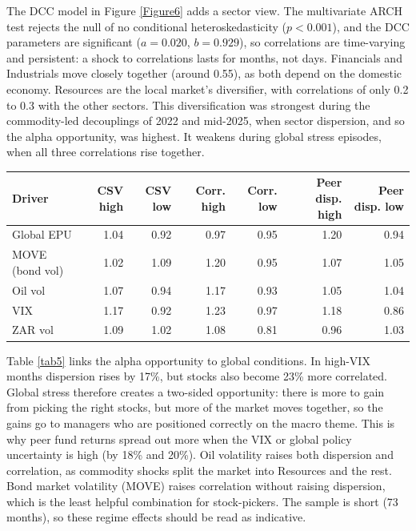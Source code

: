 \documentclass[11pt,preprint]{elsarticle}
\let\origtable\table
\let\endorigtable\endtable
\renewenvironment{table}[1][2] {
    \expandafter\origtable\expandafter[H]
} {
    \endorigtable
}
\numberwithin{equation}{section}
\numberwithin{figure}{section}
\numberwithin{table}{section}
\begin{document}
The DCC model in Figure \ref{Figure6} adds a sector view. The
multivariate ARCH test rejects the null of no conditional
heteroskedasticity (\(p < 0.001\)), and the DCC parameters are
significant (\(a = 0.020\), \(b = 0.929\)), so correlations are
time-varying and persistent: a shock to correlations lasts for months,
not days. Financials and Industrials move closely together (around
0.55), as both depend on the domestic economy. Resources are the local
market's diversifier, with correlations of only 0.2 to 0.3 with the
other sectors. This diversification was strongest during the
commodity-led decouplings of 2022 and mid-2025, when sector dispersion,
and so the alpha opportunity, was highest. It weakens during global
stress episodes, when all three correlations rise together.

\begin{table}[H]
\centering
\caption{Alpha-opportunity measures in high and low macro regimes, relative to their average \label{tab5}} 
\begingroup\footnotesize
\begin{tabular}{lrrrrrr}
  \hline
Driver & CSV high & CSV low & Corr. high & Corr. low & Peer disp. high & Peer disp. low \\ 
  \hline
Global EPU & 1.04 & 0.92 & 0.97 & 0.95 & 1.20 & 0.94 \\ 
  MOVE (bond vol) & 1.02 & 1.09 & 1.20 & 0.95 & 1.07 & 1.05 \\ 
  Oil vol & 1.07 & 0.94 & 1.17 & 0.93 & 1.05 & 1.04 \\ 
  VIX & 1.17 & 0.92 & 1.23 & 0.97 & 1.18 & 0.86 \\ 
  ZAR vol & 1.09 & 1.02 & 1.08 & 0.81 & 0.96 & 1.03 \\ 
   \hline
\end{tabular}
\endgroup
\end{table}

Table \ref{tab5} links the alpha opportunity to global conditions. In
high-VIX months dispersion rises by 17\%, but stocks also become 23\%
more correlated. Global stress therefore creates a two-sided
opportunity: there is more to gain from picking the right stocks, but
more of the market moves together, so the gains go to managers who are
positioned correctly on the macro theme. This is why peer fund returns
spread out more when the VIX or global policy uncertainty is high (by
18\% and 20\%). Oil volatility raises both dispersion and correlation,
as commodity shocks split the market into Resources and the rest. Bond
market volatility (MOVE) raises correlation without raising dispersion,
which is the least helpful combination for stock-pickers. The sample is
short (73 months), so these regime effects should be read as indicative.
\end{document}
